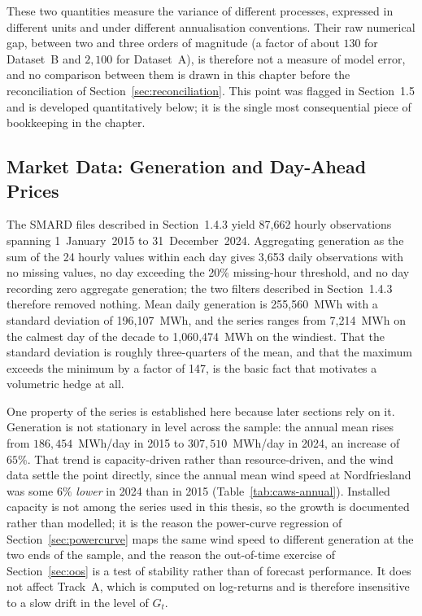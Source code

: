 \documentclass[11pt, a4paper, twoside]{article}
\begin{document}
These two quantities measure the variance of different processes, expressed in different units and under different annualisation conventions. Their raw numerical gap, between two and three orders of magnitude (a factor of about $130$ for Dataset~B and $2{,}100$ for Dataset~A), is therefore not a measure of model error, and no comparison between them is drawn in this chapter before the reconciliation of Section~\ref{sec:reconciliation}. This point was flagged in Section~1.5 and is developed quantitatively below; it is the single most consequential piece of bookkeeping in the chapter.

\subsection{Market Data: Generation and Day-Ahead Prices}
\label{sec:market-data}

The SMARD files described in Section~1.4.3 yield 87{,}662 hourly observations spanning 1~January~2015 to 31~December~2024. Aggregating generation as the sum of the 24 hourly values within each day gives 3{,}653 daily observations with no missing values, no day exceeding the 20\% missing-hour threshold, and no day recording zero aggregate generation; the two filters described in Section~1.4.3 therefore removed nothing. Mean daily generation is 255{,}560~MWh with a standard deviation of 196{,}107~MWh, and the series ranges from 7{,}214~MWh on the calmest day of the decade to 1{,}060{,}474~MWh on the windiest. That the standard deviation is roughly three-quarters of the mean, and that the maximum exceeds the minimum by a factor of 147, is the basic fact that motivates a volumetric hedge at all.

One property of the series is established here because later sections rely on it. Generation is not stationary in level across the sample: the annual mean rises from $186{,}454$~MWh/day in 2015 to $307{,}510$~MWh/day in 2024, an increase of $65\%$. That trend is capacity-driven rather than resource-driven, and the wind data settle the point directly, since the annual mean wind speed at Nordfriesland was some $6\%$ \emph{lower} in 2024 than in 2015 (Table~\ref{tab:caws-annual}). Installed capacity is not among the series used in this thesis, so the growth is documented rather than modelled; it is the reason the power-curve regression of Section~\ref{sec:powercurve} maps the same wind speed to different generation at the two ends of the sample, and the reason the out-of-time exercise of Section~\ref{sec:oos} is a test of stability rather than of forecast performance. It does not affect Track~A, which is computed on log-returns and is therefore insensitive to a slow drift in the level of $G_t$.
\end{document}
